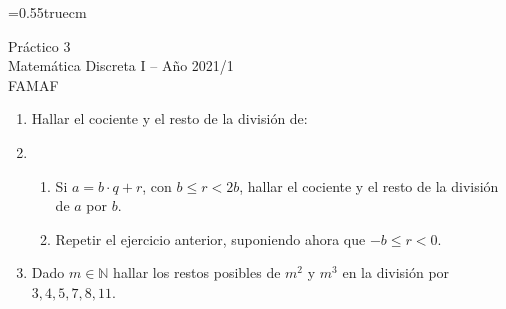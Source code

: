 \documentclass[a4paper,12pt,twoside,spanish,reqno]{amsbook}
\numberwithin{equation}{section}
\begin{document}
    \baselineskip=0.55truecm %

  {\bf \begin{center}\large  Práctico 3 \\ Matemática Discreta I -- Año 2021/1 \\ FAMAF \end{center}}



\begin{enumerate}
\setlength\itemsep{1.1em}


\item Hallar el cociente y el resto de la división de:

\item 
\begin{enumerate}
  \item Si $a=b\cdot q+r$, con $b \le r <2 b$, hallar el cociente y el resto de la división de $a$ por $b$.
  \item Repetir el ejercicio anterior, suponiendo ahora que $-b \le r < 0$.
\end{enumerate}


\item Dado $m\in \mathbb N$ hallar los restos posibles de $m^2$ y $m^3$ en la división por $3,4,5,7,8, 11$.


\end{enumerate}
\end{document}
